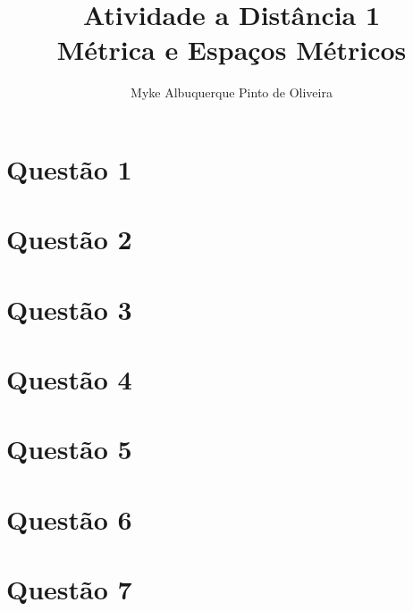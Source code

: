 \documentclass[10pt,a4paper]{article}
\author{Myke Albuquerque Pinto de Oliveira}
\title{\Huge Atividade a Distância 1 \\ 
	Métrica e Espaços Métricos}
\begin{document}
	
	\maketitle
	\newpage
	
	\section*{Questão 1}
	
	\section*{Questão 2}
	
	\section*{Questão 3}
	
	\section*{Questão 4}
	
	\section*{Questão 5}
	
	\section*{Questão 6}
	
	\section*{Questão 7}
	
	
\end{document}

